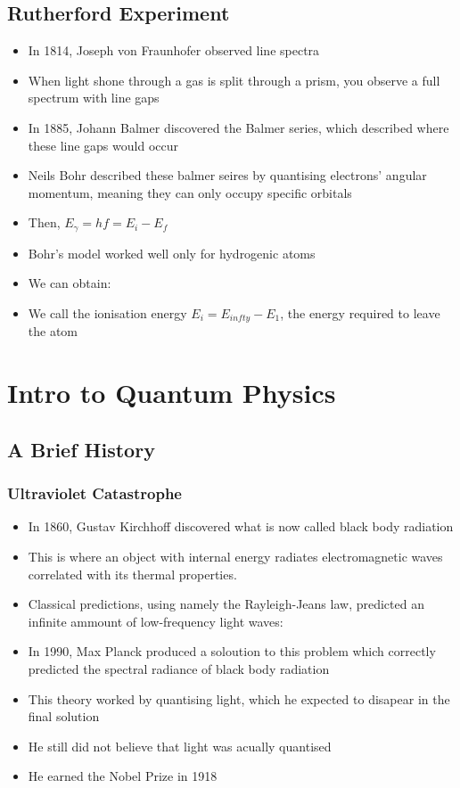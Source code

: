 \documentclass{article}
\begin{document}
\subsection{Rutherford Experiment}
\begin{itemize}
    \item In 1814, Joseph von Fraunhofer observed line spectra
    \item When light shone through a gas is split through a prism, you observe a full spectrum with line gaps
    \item In 1885, Johann Balmer discovered the Balmer series, which described where these line gaps would occur 
    \item Neils Bohr described these balmer seires by quantising electrons' angular momentum, meaning they can only occupy specific orbitals
    \item Then, \(E_{\gamma}=hf=E_i-E_f\)
    \item Bohr's model worked well only for hydrogenic atoms
    \item We can obtain:
    \item We call the ionisation energy \(E_i=E_{infty}-E_1\), the energy required to leave the atom

\end{itemize}


\newpage
\section{Intro to Quantum Physics}
\subsection{A Brief History}

\subsubsection*{Ultraviolet Catastrophe}

\begin{itemize}
    \item In 1860, Gustav Kirchhoff discovered what is now called black body radiation
    \item This is where an object with internal energy radiates electromagnetic waves correlated with its thermal properties.
    \item Classical predictions, using namely the Rayleigh-Jeans law, predicted an infinite ammount of low-frequency light waves:
    \item In 1990, Max Planck produced a soloution to this problem which correctly predicted the spectral radiance of black body radiation
    \item This theory worked by quantising light, which he expected to disapear in the final solution
    \item He still did not believe that light was acually quantised
    \item He earned the Nobel Prize in 1918 
\end{itemize}
\end{document}
